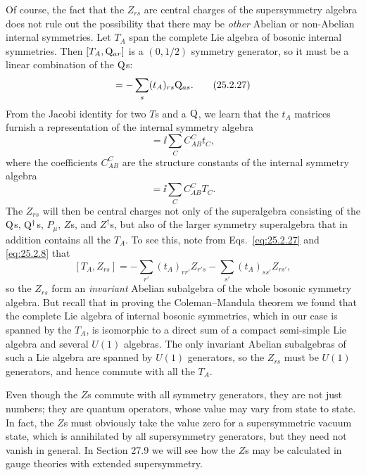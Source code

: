Of course, the fact that the \(Z_{rs}\) are central charges of the
supersymmetry algebra does not rule out the possibility that there may be
\emph{other} Abelian or non-Abelian internal symmetries. Let \(T_A\) span
the complete Lie algebra of bosonic internal symmetries. Then
\([T_A,\mathrm{Q}_{ar}]\) is a \((0,1/2)\) symmetry generator, so it must be
a linear combination of the \(\mathrm{Q}\)s:
\begin{equation}
[T_A,\WeylQ_{ar}]
=-\sum_s(t_A)_{rs}\WeylQ_{as}.
\tag{25.2.27}\label{eq:25.2.27}
\end{equation}
From the Jacobi identity for two \(T\)s and a \(\mathrm{Q}\), we learn that
the \(t_A\) matrices furnish a representation of the internal symmetry
algebra
\begin{equation}
[t_A,t_B]=\ii\sum_C C^C_{AB}t_C,
\tag{25.2.28}\label{eq:25.2.28}
\end{equation}
where the coefficients \(C^C_{AB}\) are the structure constants of the
internal symmetry algebra
\begin{equation}
[T_A,T_B]=\ii\sum_C C^C_{AB}T_C.
\tag{25.2.29}\label{eq:25.2.29}
\end{equation}
The \(Z_{rs}\) will then be central charges not only of the superalgebra
consisting of the \(\mathrm{Q}\)s, \(\mathrm{Q}^\dagger\)s, \(P_\mu\), \(Z\)s,
and \(Z^\dagger\)s, but also of the larger symmetry superalgebra that in
addition
contains all the \(T_A\). To see this, note from
Eqs.~\eqref{eq:25.2.27} and \eqref{eq:25.2.8} that
\[
[T_A,Z_{rs}]
=-\sum_{r'}(t_A)_{rr'}Z_{r's}
-\sum_{s'}(t_A)_{ss'}Z_{rs'},
\]
so the \(Z_{rs}\) form an \emph{invariant} Abelian subalgebra of the whole
bosonic symmetry algebra. But recall that in proving the Coleman--Mandula
theorem we found that the complete Lie algebra of internal bosonic
symmetries, which in our case is spanned by the \(T_A\), is isomorphic to
a direct sum of a compact semi-simple Lie algebra and several \(U(1)\)
algebras. The only invariant Abelian subalgebras of such a Lie algebra are
spanned by \(U(1)\) generators, so the \(Z_{rs}\) must be \(U(1)\)
generators, and hence commute with all the \(T_A\).

Even though the \(Z\)s commute with all symmetry generators, they are not
just numbers; they are quantum operators, whose value may vary from state
to state. In fact, the \(Z\)s must obviously take the value zero for a
supersymmetric vacuum state, which is annihilated by all supersymmetry
generators, but they need not vanish in general. In Section 27.9 we will
see how the \(Z\)s may be calculated in gauge theories with extended
supersymmetry.

